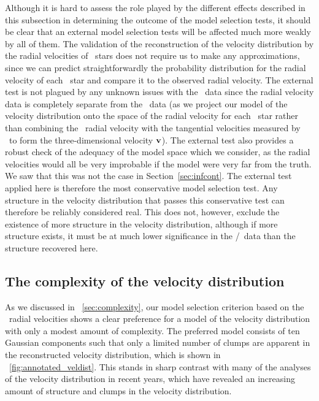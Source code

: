 Although it is hard to assess the role played by the different effects
described in this subsection in determining the outcome of the model
selection tests, it should be clear that an external model selection
tests will be affected much more weakly by all of them. The validation
of the reconstruction of the velocity distribution by the radial
velocities of \gcsabb\ stars does not require us to make any
approximations, since we can predict straightforwardly the probability
distribution for the radial velocity of each \gcsabb\ star and compare
it to the observed radial velocity. The external test is not plagued
by any unknown issues with the \Hipparcos\ data since the radial
velocity data is completely separate from the \Hipparcos\ data (as we
project our model of the velocity distribution onto the space of the
radial velocity for each \gcsabb\ star rather than combining the
\gcsabb\ radial velocity with the tangential velocities measured by
\Hipparcos\ to form the three-dimensional velocity $\boldsymbol{\mathbf{v}}$). The
external test also provides a robust check of the adequacy of the
model space which we consider, as the radial velocities would all be
very improbable if the model were very far from the truth. We saw that
this was not the case in Section~\ref{sec:infcont}. The external test
applied here is therefore the most conservative model selection
test. Any structure in the velocity distribution that passes this
conservative test can therefore be reliably considered real. This does
not, however, exclude the existence of more structure in the velocity
distribution, although if more structure exists, it must be at much
lower significance in the \Hipparcos/\gcsabb\ data than the structure
recovered here.


\subsection{The complexity of the velocity distribution}

As we discussed in \sectionname~\ref{sec:complexity}, our model
selection criterion based on the \gcsabb\ radial velocities shows a
clear preference for a model of the velocity distribution with only a
modest amount of complexity. The preferred model consists of ten
Gaussian components such that only a limited number of clumps are
apparent in the reconstructed velocity distribution, which is shown in
\figurename~\ref{fig:annotated_veldist}. This stands in sharp contrast
with many of the analyses of the velocity distribution in recent
years, which have revealed an increasing amount of structure and
clumps in the velocity distribution.

